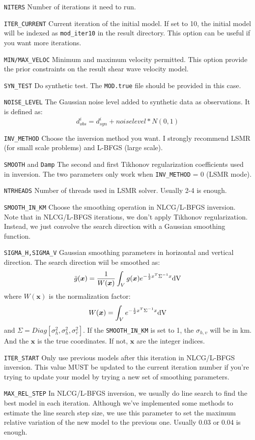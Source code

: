 \documentclass[UTF8]{article}
\begin{document}
\begin{description}
\item \texttt{NITERS} Number of iterations it need to run.
\item \texttt{ITER\_CURRENT} Current iteration of the initial model. If set to 10, the initial model will be indexed as \texttt{mod\_iter10} in the result directory. This option can be useful if you want more iterations.
\item \texttt{MIN/MAX\_VELOC} Minimum and maximum velocity permitted. This option provide the prior constraints on the result shear wave velocity model.
\item \texttt{SYN\_TEST} Do synthetic test. The \texttt{MOD.true} file should be provided in this case.
\item \texttt{NOISE\_LEVEL} The Gaussian noise level added to synthetic data as observations. It is defined as:
\[   
    d_{obs}^i = d_{syn}^i +  noiselevel * N(0,1)
\]
\item \texttt{INV\_METHOD} Choose the inversion method you want. I strongly recommend LSMR (for small scale problems) and L-BFGS (large scale).
\item \texttt{SMOOTH} and \texttt{Damp} The second and first Tikhonov regularization coefficients used in inversion. The two parameters only work when \texttt{INV\_METHOD} = 0 (LSMR mode).
\item \texttt{NTRHEADS} Number of threads used in LSMR solver. Usually 2-4 is enough.
\item \texttt{SMOOTH\_IN\_KM} Choose the smoothing operation in NLCG/L-BFGS inversion. Note that in NLCG/L-BFGS iterations, we don't apply Tikhonov regularization. Instead, we just convolve the search direction with a Gaussian smoothing function.
\item \texttt{SIGMA\_H,SIGMA\_V} Gaussian smoothing parameters in horizontal and vertical direction.  The search direction wiil be smoothed as:
\[
\bar{g}(\bm{x}) = \frac{1}{W(\bm{x})} \int_V g(\bm{x}) e^{- \frac{1}{2} x^T \Sigma^{-1} x} \rm{d}V
\]
where $W(\bm{x})$ is the normalization factor: 
\[
W(\bm{x}) = \int_V e^{-\frac{1}{2} x^T \Sigma^{-1} x} \rm{d}V
\]
and $\Sigma = Diag\left[\sigma_h^2,\sigma_h^2,\sigma_v^2  \right]$. If the \texttt{SMOOTH\_IN\_KM} is set to 1, the $\sigma_{h,v}$ will be in km. And the $\bm{x}$ is the true coordinates. If not, $\bm{x}$ are the integer indices.
\item \texttt{ITER\_START} Only use previous models after this iteration in NLCG/L-BFGS inversion. This value MUST be updated to the current iteration number if you're trying to update your model by trying a new set of smoothing parameters.
\item \texttt{MAX\_REL\_STEP} In NLCG/L-BFGS inversion, we usually do line search to find the best model in each iteration. Although we've implemented some methods to estimate the line search step size, we use this parameter to set the maximum relative variation of the new model to the previous one. Usually 0.03 or 0.04 is enough.
\end{description}
\end{document}
